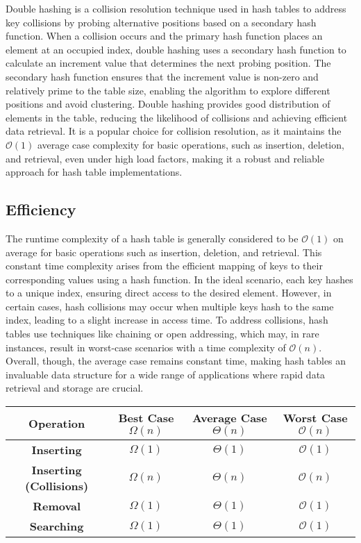 Double hashing is a collision resolution technique used in hash tables to address key collisions by probing alternative positions based on a secondary hash function. When a collision occurs and the primary hash 
function places an element at an occupied index, double hashing uses a secondary hash function to calculate an increment value that determines the next probing position. The secondary hash function ensures that 
the increment value is non-zero and relatively prime to the table size, enabling the algorithm to explore different positions and avoid clustering. Double hashing provides good distribution of elements in the table, 
reducing the likelihood of collisions and achieving efficient data retrieval. It is a popular choice for collision resolution, as it maintains the $\mathcal{O}(1)$ average case complexity for basic operations, 
such as insertion, deletion, and retrieval, even under high load factors, making it a robust and reliable approach for hash table implementations.

\subsection*{Efficiency}

The runtime complexity of a hash table is generally considered to be $\mathcal{O}(1)$ on average for basic operations such as insertion, deletion, and retrieval. This constant time complexity arises from 
the efficient mapping of keys to their corresponding values using a hash function. In the ideal scenario, each key hashes to a unique index, ensuring direct access to the desired element. However, in certain 
cases, hash collisions may occur when multiple keys hash to the same index, leading to a slight increase in access time. To address collisions, hash tables use techniques like chaining or open addressing, 
which may, in rare instances, result in worst-case scenarios with a time complexity of $\mathcal{O}(n)$. Overall, though, the average case remains constant time, making hash tables an invaluable data structure 
for a wide range of applications where rapid data retrieval and storage are crucial.

\begin{center}
    \begin{tabular}[ht]{|c|c|c|c|}
        \hline \textbf{Operation} & \textbf{Best Case } $\Omega(n)$ & \textbf{Average Case } $\Theta(n)$ & \textbf{Worst Case } $\mathcal{O}(n)$ \\ \hline
        \textbf{Inserting} & $\Omega(1)$ & $\Theta(1)$ & $\mathcal{O}(1)$ \\ \hline
        \textbf{Inserting (Collisions)} & $\Omega(n)$ & $\Theta(n)$ & $\mathcal{O}(n)$ \\ \hline
        \textbf{Removal} & $\Omega(1)$ & $\Theta(1)$ & $\mathcal{O}(1)$ \\ \hline
        \textbf{Searching} & $\Omega(1)$ & $\Theta(1)$ & $\mathcal{O}(1)$ \\ \hline
    \end{tabular}
\end{center}

